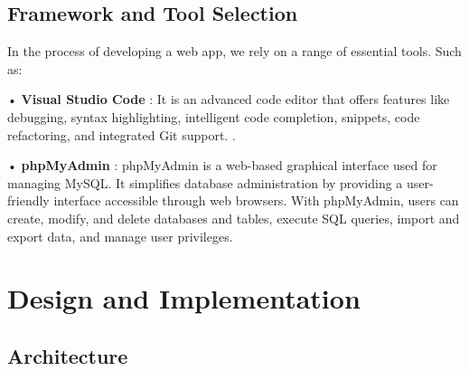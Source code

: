 \documentclass{nascproject}
\begin{document}
\section{Framework and Tool Selection}
In the process of developing a web app, we rely on a range of essential tools.
Such as:

• \textbf{Visual Studio Code} : It is an advanced code editor that offers features like debugging, syntax highlighting, intelligent code completion, snippets, code refactoring, and integrated Git support.
.

• \textbf{phpMyAdmin} : phpMyAdmin is a web-based graphical interface used for managing MySQL. It simplifies database administration by providing a user-friendly interface accessible through web browsers. With phpMyAdmin, users can create, modify, and delete databases and tables, execute SQL queries, import and export data, and manage user privileges.


\chapter{Design and Implementation}
\section{Architecture}
\end{document}
